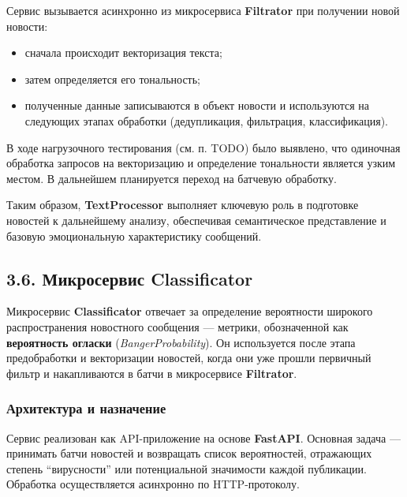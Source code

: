 Сервис вызывается асинхронно из микросервиса \textbf{Filtrator} при
получении новой новости:

\begin{itemize}
\tightlist
\item
  сначала происходит векторизация текста;\\
\item
  затем определяется его тональность;\\
\item
  полученные данные записываются в объект новости и используются на
  следующих этапах обработки (дедупликация, фильтрация, классификация).
\end{itemize}

В ходе нагрузочного тестирования (см. п. TODO) было выявлено, что
одиночная обработка запросов на векторизацию и определение тональности
является узким местом. В дальнейшем планируется переход на батчевую
обработку.

Таким образом, \textbf{TextProcessor} выполняет ключевую роль в
подготовке новостей к дальнейшему анализу, обеспечивая семантическое
представление и базовую эмоциональную характеристику сообщений.

\hypertarget{ux43cux438ux43aux440ux43eux441ux435ux440ux432ux438ux441-classificator}{%
\subsection{3.6. Микросервис
Classificator}\label{ux43cux438ux43aux440ux43eux441ux435ux440ux432ux438ux441-classificator}}

Микросервис \textbf{Classificator} отвечает за определение вероятности
широкого распространения новостного сообщения --- метрики, обозначенной
как \textbf{вероятность огласки} (\emph{BangerProbability}). Он
используется после этапа предобработки и векторизации новостей, когда
они уже прошли первичный фильтр и накапливаются в батчи в микросервисе
\textbf{Filtrator}.

\hypertarget{ux430ux440ux445ux438ux442ux435ux43aux442ux443ux440ux430-ux438-ux43dux430ux437ux43dux430ux447ux435ux43dux438ux435}{%
\subsubsection{\texorpdfstring{\textbf{Архитектура и
назначение}}{Архитектура и назначение}}\label{ux430ux440ux445ux438ux442ux435ux43aux442ux443ux440ux430-ux438-ux43dux430ux437ux43dux430ux447ux435ux43dux438ux435}}

Сервис реализован как API-приложение на основе \textbf{FastAPI}.
Основная задача --- принимать батчи новостей и возвращать список
вероятностей, отражающих степень ``вирусности'' или потенциальной
значимости каждой публикации. Обработка осуществляется асинхронно по
HTTP-протоколу.

